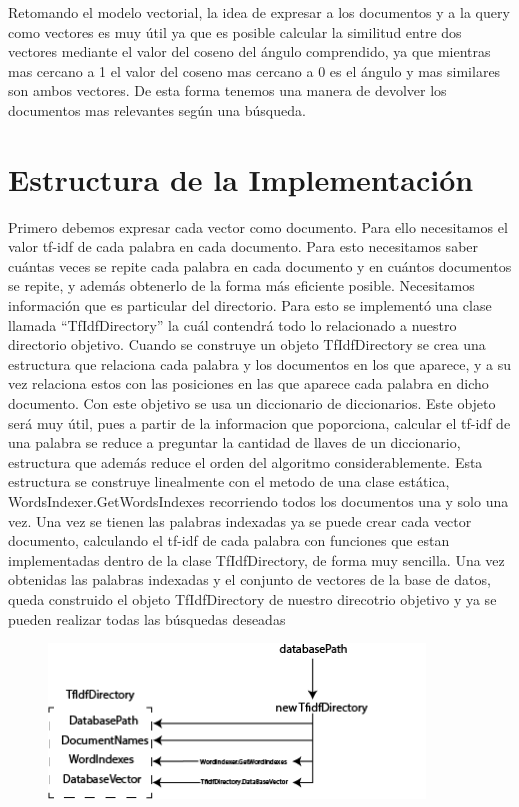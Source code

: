 \documentclass[a4paper, 12pt]{article}
\begin{document}
Retomando el modelo vectorial, la idea de expresar a los documentos y a la query como vectores es muy útil ya que es posible calcular la similitud entre dos vectores mediante el valor del coseno del ángulo comprendido, ya que mientras mas cercano a 1 el valor del coseno mas cercano a 0 es el ángulo y mas similares son ambos vectores. De esta forma tenemos una manera de devolver los documentos mas relevantes según una búsqueda.

\section{Estructura de la Implementación}
Primero debemos expresar cada vector como documento. Para ello necesitamos el valor tf-idf de cada palabra en cada documento. Para esto necesitamos saber cuántas veces se repite cada palabra en cada documento y en cuántos documentos se repite, y además obtenerlo de la forma más eficiente posible. Necesitamos información que es particular del directorio. Para esto se implementó una clase llamada “TfIdfDirectory” la cuál contendrá todo lo relacionado a nuestro directorio objetivo. Cuando se construye un objeto TfIdfDirectory se crea una estructura que relaciona cada palabra y los documentos en los que aparece, y a su vez relaciona estos con las posiciones en las que aparece cada palabra en dicho documento. Con este objetivo se usa un diccionario de diccionarios. Este objeto será muy útil, pues a partir de la informacion que poporciona, calcular el tf-idf de una palabra se reduce a preguntar la cantidad de llaves de un diccionario, estructura que además reduce el orden del algoritmo considerablemente. Esta estructura se construye linealmente con el metodo de una clase estática, WordsIndexer.GetWordsIndexes recorriendo todos los documentos una y solo una vez. Una vez se tienen las palabras indexadas ya se puede crear cada vector documento, calculando el tf-idf de cada palabra con funciones que estan implementadas dentro de la clase TfIdfDirectory, de forma muy sencilla. Una vez obtenidas las palabras indexadas y el conjunto de vectores de la base de datos, queda construido el objeto TfIdfDirectory de nuestro direcotrio objetivo y ya se pueden realizar todas las búsquedas deseadas
\begin{figure}
    \center
    \includegraphics[width=10cm]{RepresentacionDelPrecalculo.png}
\end{figure}
\end{document}
